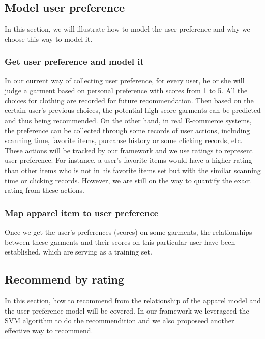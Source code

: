 \subsection{Model user preference}
In this section, we will illustrate how to model the user preference and why we choose this way to model it.

\subsubsection{Get user preference and model it}
In our current way of collecting user preference, for every user, he or she will judge a garment based on personal preference with scores from 1 to 5. All the choices for clothing are recorded for future recommendation. Then based on the certain user's previous choices, the potential high-score garments can be predicted and thus being recommended. On the other hand, in real E-commerce systems, the preference can be collected through some records of user actions, including scanning time, favorite items, purcahse history or some clicking records, etc. These actions will be tracked by our framework and we use ratings to represent user preference. For instance, a user's favorite items would have a higher rating than other items who is not in his favorite items set but with the similar scanning time or clicking records. However, we are still on the way to quantify the exact rating from these actions. 
  
\subsubsection{Map apparel item to user preference}
Once we get the user's preferences (scores) on some garments, the relationships between these garments and their scores on this particular user have been established, which are serving as a training set.

\subsection{Recommend by rating}
In this section, how to recommend from the relationship of the apparel model and the user preference model will be covered. In our framework we leverageed the SVM algorithm to do the recommendition and we also proposeed another effective way to recommend.

